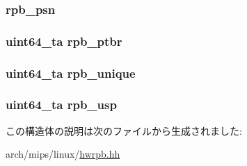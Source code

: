\label{structLinux_1_1pcb__struct_a40e22c605b327545d8d85f26c35d6a65}
\hypertarget{structLinux_1_1pcb__struct_abaed7481c678c94351f02c3eb258d776}{
\subsubsection[{rpb\_\-psn}]{ rpb\_\-psn}}
\label{structLinux_1_1pcb__struct_abaed7481c678c94351f02c3eb258d776}
\hypertarget{structLinux_1_1pcb__struct_a427d9bed92f47bb2299658856647a707}{
\subsubsection[{rpb\_\-ptbr}]{\setlength{\rightskip}{0pt plus 5cm}uint64\_\-ta rpb\_\-ptbr}}
\label{structLinux_1_1pcb__struct_a427d9bed92f47bb2299658856647a707}
\hypertarget{structLinux_1_1pcb__struct_aa3078038e064384816ca56e2c5682fcc}{
\subsubsection[{rpb\_\-unique}]{\setlength{\rightskip}{0pt plus 5cm}uint64\_\-ta rpb\_\-unique}}
\label{structLinux_1_1pcb__struct_aa3078038e064384816ca56e2c5682fcc}
\hypertarget{structLinux_1_1pcb__struct_aba4e265000058830dea16c4d418225ed}{
\subsubsection[{rpb\_\-usp}]{\setlength{\rightskip}{0pt plus 5cm}uint64\_\-ta rpb\_\-usp}}
\label{structLinux_1_1pcb__struct_aba4e265000058830dea16c4d418225ed}


この構造体の説明は次のファイルから生成されました:\begin{DoxyCompactItemize}
\item 
arch/mips/linux/\hyperlink{hwrpb_8hh}{hwrpb.hh}\end{DoxyCompactItemize}
